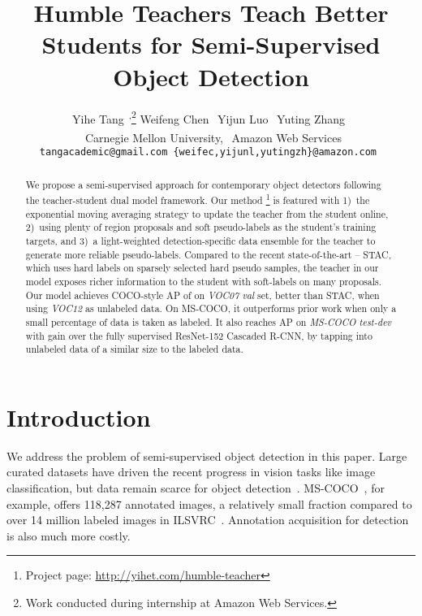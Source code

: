\documentclass[final]{cvpr}
\begin{document}
\title{Humble Teachers Teach Better Students for Semi-Supervised Object Detection}

\author{Yihe Tang\textsuperscript{~,}\thanks{Work conducted during internship at Amazon Web Services.} \quad Weifeng Chen\textsuperscript{~} \quad Yijun Luo\textsuperscript{~} \quad Yuting Zhang\textsuperscript{~}\vspace{0.2em}\\
\textsuperscript{~}Carnegie Mellon University, \textsuperscript{~}Amazon Web Services\\
{\tt\small tangacademic@gmail.com \quad \{weifec,yijunl,yutingzh\}@amazon.com
}
\vspace{-0.2em}
}
\maketitle

\thispagestyle{empty}
\begin{abstract}
We propose a semi-supervised approach for contemporary object detectors following the teacher-student dual model framework. Our method
\footnote{Project page: \url{http://yihet.com/humble-teacher}}
is featured with 
1)~the exponential moving averaging strategy to update
the teacher from the student online, 2)~using plenty of region proposals and soft pseudo-labels as the student's training targets, and 
3)~a light-weighted detection-specific data ensemble for the teacher to generate more reliable pseudo-labels. 
Compared to the recent state-of-the-art -- STAC, which uses hard labels on sparsely selected hard pseudo samples, the teacher in our model exposes richer information to the student with soft-labels on many proposals. 
Our model achieves COCO-style AP of  on \emph{VOC07 val} set,  better than STAC, when using \emph{VOC12} as unlabeled data. 
On MS-COCO, it outperforms prior work when only a small percentage of data is taken as labeled. 
It also reaches  AP on \emph{MS-COCO test-dev} with  gain over the fully supervised ResNet-152 Cascaded R-CNN, by tapping into unlabeled data of a similar size to the labeled data. 
\end{abstract}

\section{Introduction}
We address the problem of semi-supervised object detection in this paper. 
Large curated datasets have driven the recent progress in vision tasks like image classification, 
but data remain scarce for object detection~\cite{girshick2014rich,ren2015faster,liu2016ssd,cai2018cascade,law2018cornernet,redmon2016you}. MS-COCO~\cite{lin2014microsoft}, for example, offers 118,287 annotated images, a relatively small fraction compared to over 14 million labeled images in ILSVRC~\cite{russakovsky2015imagenet}.
Annotation acquisition for detection is also much more costly. 
\end{document}
